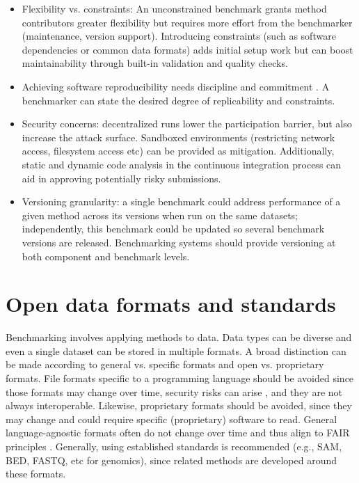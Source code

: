 \documentclass[11pt]{article}
\begin{document}
\begin{itemize}
    \item Flexibility vs. constraints:  An unconstrained benchmark grants method contributors greater flexibility but requires more effort from the benchmarker (maintenance, version support). Introducing constraints (such as software dependencies or common data formats) adds initial setup work but can boost maintainability through built-in validation and quality checks.
    \item  Achieving software reproducibility needs discipline and commitment \cite{Lamb2021-tb}. A benchmarker can state the desired degree of replicability and constraints. 
    \item  Security concerns: decentralized runs lower the participation barrier, but also increase the attack  surface. Sandboxed environments (restricting network access, filesystem access etc) can be provided as mitigation. Additionally, static and dynamic code analysis in the continuous integration process can aid in approving potentially risky submissions.
    \item Versioning granularity: a single benchmark could address performance of a given method across its versions when run on the same datasets; independently, this benchmark could be updated so several benchmark versions are released. Benchmarking systems should provide versioning at both component and benchmark levels.
\end{itemize}


\section*{Open data formats and standards}

Benchmarking involves applying methods to data. Data types can be diverse and even a single dataset can be stored in multiple formats. A broad distinction can be made according to general vs. specific formats and open vs. proprietary formats. File formats specific to a programming language should be avoided since those formats may change over time, security risks can arise \cite{Huynh2023-pq, Bleih2024-lv}, and they are not always interoperable. Likewise, proprietary formats should be avoided, since they may change and could require specific (proprietary) software to read. General language-agnostic formats often do not change over time and thus align to FAIR principles \cite{Wilkinson2016-bh}. Generally, using established standards is recommended (e.g., SAM, BED, FASTQ, etc for genomics), since related methods are developed around these formats.
\end{document}
